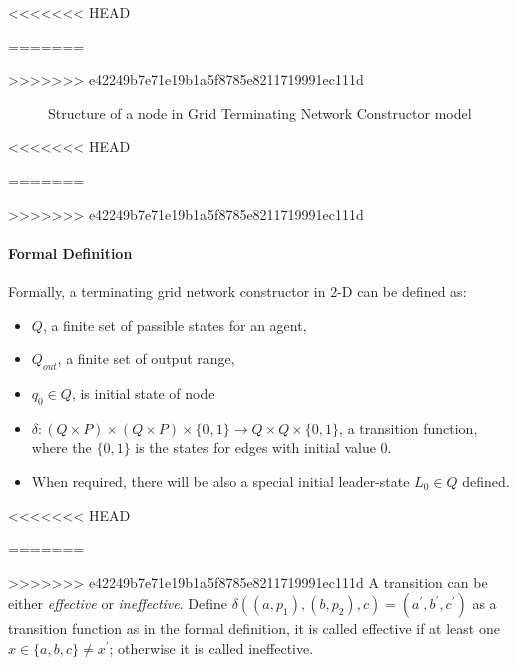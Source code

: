 <<<<<<< HEAD
\par\noindent
=======
\par
>>>>>>> e42249b7e71e19b1a5f8785e8211719991ec111d
\begin{figure}[H]
\begin{center}
\end{center}
\caption{Structure of a node in Grid Terminating Network Constructor model}
\end{figure}

<<<<<<< HEAD
\par\noindent
=======
\par
>>>>>>> e42249b7e71e19b1a5f8785e8211719991ec111d
\paragraph{Formal Definition}
Formally, a terminating grid network constructor in 2-D can be defined as:
\begin{itemize}
  \item $Q$, a finite set of passible states for an agent,
  \item $Q_{out}$, a finite set of output range,
  \item $q_{0} \in Q $, is initial state of node
  \item $\delta: (Q \times P ) \times (Q \times P) \times \{0,1\} \to Q \times Q \times \{0,1\}$, a transition function, where the $\{0,1\}$ is the states for edges with initial value 0.
  \item When required, there will be also a special initial leader-state $L_{0} \in Q $ defined.
\end{itemize}
<<<<<<< HEAD
\par\noindent
=======
\par
>>>>>>> e42249b7e71e19b1a5f8785e8211719991ec111d
A transition can be either \textit{effective}
or \textit{ineffective}. Define $\delta((a, p_{1}), (b, p_{2}), c) = (a^{'}, b^{'},c^{'})$ as a transition function
as in the formal definition, it is called effective if at least one $x \in \{a,b,c\} \not= x^{'} $; otherwise it is called ineffective.

